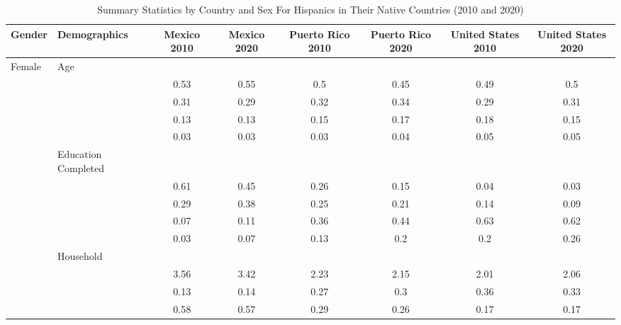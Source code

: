 \begin{table}[ht]
\centering
\caption{Summary Statistics by Country and Sex For Hispanics in Their Native Countries (2010 and 2020)} 
\begingroup\small
\begin{tabular}{l>{\raggedright\arraybackslash}p{3.2cm}|cccccc}
  \hline
Gender & Demographics & Mexico 2010 & Mexico 2020 & Puerto Rico 2010 & Puerto Rico 2020 & United States 2010 & United States 2020 \\ 
  \hline
Female & Age &  &  &  &  &  &  \\ 
   & \multicolumn{1}{>{\raggedleft\arraybackslash}p{1.5cm}|}{\makebox[1.5cm][r]{60 - 69 }} & 0.53 & 0.55 & 0.5 & 0.45 & 0.49 & 0.5 \\ 
   & \multicolumn{1}{>{\raggedleft\arraybackslash}p{1.5cm}|}{\makebox[1.5cm][r]{70 - 79 }} & 0.31 & 0.29 & 0.32 & 0.34 & 0.29 & 0.31 \\ 
   & \multicolumn{1}{>{\raggedleft\arraybackslash}p{1.5cm}|}{\makebox[1.5cm][r]{80 - 89 }} & 0.13 & 0.13 & 0.15 & 0.17 & 0.18 & 0.15 \\ 
   & \multicolumn{1}{>{\raggedleft\arraybackslash}p{1.5cm}|}{\makebox[1.5cm][r]{90 plus }} & 0.03 & 0.03 & 0.03 & 0.04 & 0.05 & 0.05 \\ 
   & Education Completed &  &  &  &  &  &  \\ 
   & \multicolumn{1}{>{\raggedleft\arraybackslash}p{3.2cm}|}{\makebox[3.2cm][r]{Less than Primary }} & 0.61 & 0.45 & 0.26 & 0.15 & 0.04 & 0.03 \\ 
   & \multicolumn{1}{>{\raggedleft\arraybackslash}p{1.7cm}|}{\makebox[1.7cm][r]{Primary }} & 0.29 & 0.38 & 0.25 & 0.21 & 0.14 & 0.09 \\ 
   & \multicolumn{1}{>{\raggedleft\arraybackslash}p{2cm}|}{\makebox[2cm][r]{Secondary }} & 0.07 & 0.11 & 0.36 & 0.44 & 0.63 & 0.62 \\ 
   & \multicolumn{1}{>{\raggedleft\arraybackslash}p{2cm}|}{\makebox[2cm][r]{University }} & 0.03 & 0.07 & 0.13 & 0.2 & 0.2 & 0.26 \\ 
   & Household &  &  &  &  &  &  \\ 
   & \multicolumn{1}{>{\raggedleft\arraybackslash}p{2.7cm}|}{\makebox[2.7cm][r]{Household Size }} & 3.56 & 3.42 & 2.23 & 2.15 & 2.01 & 2.06 \\ 
   & \multicolumn{1}{>{\raggedleft\arraybackslash}p{2.2cm}|}{\makebox[2.2cm][r]{Lives Alone }} & 0.13 & 0.14 & 0.27 & 0.3 & 0.36 & 0.33 \\ 
   & \multicolumn{1}{>{\raggedleft\arraybackslash}p{2.9cm}|}{\makebox[2.9cm][r]{Lives with Child }} & 0.58 & 0.57 & 0.29 & 0.26 & 0.17 & 0.17 \\ 

\end{tabular}
\end{table}
